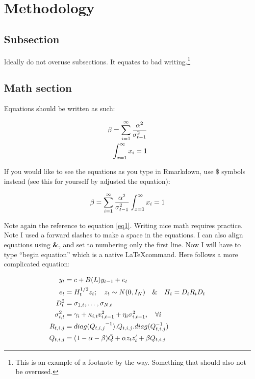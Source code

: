\documentclass[11pt,preprint, authoryear]{elsarticle}
\numberwithin{equation}{section}
\numberwithin{figure}{section}
\numberwithin{table}{section}
\let\rmarkdownfootnote\footnote%
\def\footnote{\protect\rmarkdownfootnote}
\begin{document}
\section{Methodology}\label{methodology}

\subsection{Subsection}\label{subsection}

Ideally do not overuse subsections. It equates to bad writing.\footnote{This
  is an example of a footnote by the way. Something that should also not
  be overused.}

\subsection{Math section}\label{math-section}

Equations should be written as such:

\begin{align} 
\beta = \sum_{i = 1}^{\infty}\frac{\alpha^2}{\sigma_{t-1}^2} \label{eq1} \\ 
\int_{x = 1}^{\infty}x_{i} = 1 \notag
\end{align}

If you would like to see the equations as you type in Rmarkdown, use \$
symbols instead (see this for yourself by adjusted the equation):

\[
\beta = \sum_{i = 1}^{\infty}\frac{\alpha^2}{\sigma_{t-1}^2} \\ 
\int_{x = 1}^{\infty}x_{i} = 1
\]

Note again the reference to equation \ref{eq1}. Writing nice math
requires practice. Note I used a forward slashes to make a space in the
equations. I can also align equations using \textbf{\&}, and set to
numbering only the first line. Now I will have to type ``begin
equation'' which is a native \LaTeX command. Here follows a more
complicated equation:

\begin{align} 
    y_t &= c + B(L) y_{t-1} + e_t   \label{eq2}    \\ \notag 
    e_t &= H_t^{1/2}  z_t ; \quad z_t \sim  N(0,I_N) \quad \& \quad H_t = D_tR_tD_t \\ \notag
        D_t^2 &= {\sigma_{1,t}, \dots, \sigma_{N,t}}   \\ \notag
        \sigma_{i,t}^2 &= \gamma_i+\kappa_{i,t}  v_{i, t-1}^2 +\eta_i  \sigma_{i, t-1}^2, \quad \forall i \\ \notag
        R_{t, i, j} &= {diag(Q_{t, i, j}}^{-1}) . Q_{t, i, j} . diag(Q_{t, i, j}^{-1})  \\ \notag
        Q_{t, i, j} &= (1-\alpha-\beta)  \bar{Q} + \alpha  z_t  z_t'  + \beta  Q_{t, i, j} \notag
\end{align}
\end{document}
